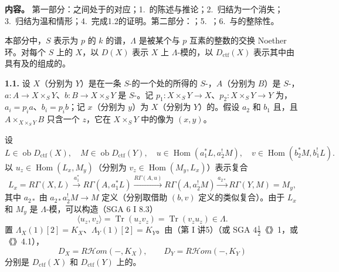 \textbf{内容。} 第一部分：之间处于的对应；1.~的陈述与推论；2.~归结为一个消失；3.~归结为温和情形；4.~完成1.2的证明。第二部分：；5.~；6.~与的整除性。

本部分中，$S$ 表示为 $p$ 的 $k$ 的谱，$\Lambda$ 是被某个与 $p$ 互素的整数的交换 Noether 环。对每个 $S$ 上的 $X$，以 $D(X)$ 表示 $X$ 上 $\Lambda$-模的，以 $D_{\mathrm{ctf}}(X)$ 表示其中由具有及的组成的。

\textbf{1.1.} 设 $X$（分别为 $Y$）是在一条 $S$-的一个处的所得的 $S$-，$A$（分别为 $B$）是 $S$-，$a:A\to X\times_S Y$、$b:B\to X\times_S Y$ 是 $S$-。记 $p_1:X\times_S Y\to X$、$p_2:X\times_S Y\to Y$ 为，$a_i=p_i a$、$b_i=p_i b$；记 $x$（分别为 $y$）为 $X$（分别为 $Y$）的。假设 $a_2$ 和 $b_1$ 且，且 $A\times_{X\times_S Y}B$ 只含一个 $z$，它在 $X\times_S Y$ 中的像为 $(x,y)$。

设
\[
 L\in\operatorname{ob}D_{\mathrm{ctf}}(X),\quad M\in\operatorname{ob}D_{\mathrm{ctf}}(Y),\quad
 u\in\operatorname{Hom}(a_1^*L,a_2^!M),\quad v\in\operatorname{Hom}(b_2^*M,b_1^!L).
\]
以 $u_z\in\operatorname{Hom}(L_x,M_y)$（分别为 $v_z\in\operatorname{Hom}(M_y,L_x)$）表示复合
\[
 L_x=R\Gamma(X,L)\xrightarrow{a_1^*}R\Gamma(A,a_1^*L)
 \xrightarrow{R\Gamma(A,u)}R\Gamma(A,a_2^!M)
 \xrightarrow{a_{2*}}R\Gamma(Y,M)=M_y,
\]
其中 $a_{2*}$ 由 $a_{2*}a_2^!M\to M$ 定义（分别取借助 $(b,v)$ 定义的类似复合）。由于 $L_x$ 和 $M_y$ 是 $\Lambda$-模，可以构造（SGA 6 I 8.3）
\[
 \langle u_z,v_z\rangle=\operatorname{Tr}(u_zv_z)=\operatorname{Tr}(v_zu_z)\in\Lambda.
 \tag{1.1.1}
\]
置 $\Lambda_X(1)[2]=K_X$、$\Lambda_Y(1)[2]=K_Y$。由（第 I 讲5）（或 SGA $4\frac12$《》1，或《》4.1），
\[
 D_X=R\mathcal Hom(-,K_X),\qquad D_Y=R\mathcal Hom(-,K_Y)
\]
分别是 $D_{\mathrm{ctf}}(X)$ 和 $D_{\mathrm{ctf}}(Y)$ 上的。

